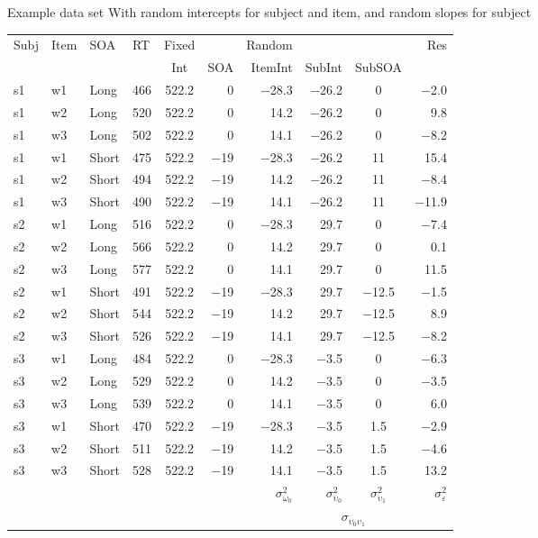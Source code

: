 \documentclass{beamer}
\begin{document}
\begin{frame}{Example data set}
  \scriptsize
With random intercepts for subject and item, and random slopes for
  subject\\[1.5ex]
  \begin{tabular}{llllcrrrcr}
    \hline
    Subj & Item & SOA & RT & Fixed &&  Random &&& Res \\
    \cline{5-6}
    \cline{7-10}
    & & & & Int & SOA & ItemInt & SubInt & SubSOA & \\
    \hline
    s1 & w1 & Long  & 466 & 522.2 & 0     & $-$28.3 & $-$26.2 & 0       & $-$2.0 \\
    s1 & w2 & Long  & 520 & 522.2 & 0     & 14.2    & $-$26.2 & 0       & 9.8 \\
    s1 & w3 & Long  & 502 & 522.2 & 0     & 14.1    & $-$26.2 & 0       & $-$8.2 \\
    s1 & w1 & Short & 475 & 522.2 & $-$19 & $-$28.3 & $-$26.2 & 11      & 15.4 \\
    s1 & w2 & Short & 494 & 522.2 & $-$19 & 14.2    & $-$26.2 & 11      & $-$8.4 \\
    s1 & w3 & Short & 490 & 522.2 & $-$19 & 14.1    & $-$26.2 & 11      & $-$11.9 \\
    s2 & w1 & Long  & 516 & 522.2 & 0     & $-$28.3 & 29.7    & 0       & $-$7.4 \\
    s2 & w2 & Long  & 566 & 522.2 & 0     & 14.2    & 29.7    & 0       & 0.1 \\
    s2 & w3 & Long  & 577 & 522.2 & 0     & 14.1    & 29.7    & 0       & 11.5 \\
    s2 & w1 & Short & 491 & 522.2 & $-$19 & $-$28.3 & 29.7    & $-$12.5 & $-$1.5 \\
    s2 & w2 & Short & 544 & 522.2 & $-$19 & 14.2    & 29.7    & $-$12.5 & 8.9 \\
    s2 & w3 & Short & 526 & 522.2 & $-$19 & 14.1    & 29.7    & $-$12.5 & $-$8.2 \\
    s3 & w1 & Long  & 484 & 522.2 & 0     & $-$28.3 & $-$3.5  & 0       & $-$6.3 \\
    s3 & w2 & Long  & 529 & 522.2 & 0     & 14.2    & $-$3.5  & 0       & $-$3.5 \\
    s3 & w3 & Long  & 539 & 522.2 & 0     & 14.1    & $-$3.5  & 0       & 6.0 \\
    s3 & w1 & Short & 470 & 522.2 & $-$19 & $-$28.3 & $-$3.5  & 1.5     & $-$2.9 \\
    s3 & w2 & Short & 511 & 522.2 & $-$19 & 14.2    & $-$3.5  & 1.5     & $-$4.6 \\
    s3 & w3 & Short & 528 & 522.2 & $-$19 & 14.1    & $-$3.5  & 1.5     & 13.2 \\
    \hline
    &&&&&& $\sigma^2_{\omega_0}$ & $\sigma^2_{\upsilon_0}$ &
    $\sigma^2_{\upsilon_1}$ & $\sigma^2_{\varepsilon}$\\ 
    &&&&&&  & \multicolumn{2}{c}{$\sigma_{\upsilon_0\upsilon_1}$} & 
  \end{tabular}
\end{frame}
\end{document}
